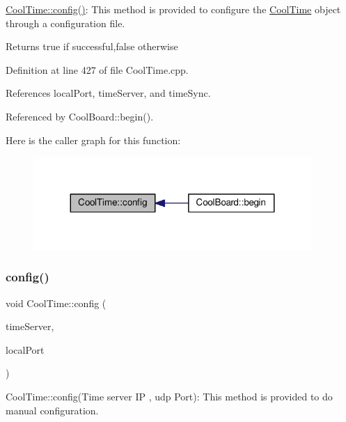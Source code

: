 \hyperlink{class_cool_time_a87c28260c1bc77091162cbcf1ee2e129}{Cool\+Time\+::config()}\+: This method is provided to configure the \hyperlink{class_cool_time}{Cool\+Time} object through a configuration file.

\begin{DoxyReturn}{Returns}
true if successful,false otherwise 
\end{DoxyReturn}


Definition at line 427 of file Cool\+Time.\+cpp.



References local\+Port, time\+Server, and time\+Sync.



Referenced by Cool\+Board\+::begin().

Here is the caller graph for this function\+:
\nopagebreak
\begin{figure}[H]
\begin{center}
\leavevmode
\includegraphics[width=299pt]{d6/d49/class_cool_time_a87c28260c1bc77091162cbcf1ee2e129_icgraph}
\end{center}
\end{figure}
\mbox{\label{class_cool_time_a014656d0d3f74d6391364b92b13e0780}} 
\subsubsection{\texorpdfstring{config()}{config()}\hspace{0.1cm}{\footnotesize\ttfamily [2/2]}}
{\footnotesize\ttfamily void Cool\+Time\+::config (\begin{DoxyParamCaption}\item[{I\+P\+Address}]{time\+Server,  }\item[{unsigned int}]{local\+Port }\end{DoxyParamCaption})}

Cool\+Time\+::config(\+Time server I\+P , udp Port)\+: This method is provided to do manual configuration. 

